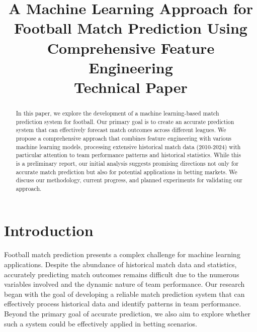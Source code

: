 \documentclass[conference]{IEEEtran}
\begin{document}
\title{A Machine Learning Approach for Football Match Prediction Using Comprehensive Feature Engineering\\
\large{Technical Paper}}

\author{
}

\maketitle

\begin{abstract}
In this paper, we explore the development of a machine learning-based match prediction system for football. Our primary goal is to create an accurate prediction system that can effectively forecast match outcomes across different leagues. We propose a comprehensive approach that combines feature engineering with various machine learning models, processing extensive historical match data (2010-2024) with particular attention to team performance patterns and historical statistics. While this is a preliminary report, our initial analysis suggests promising directions not only for accurate match prediction but also for potential applications in betting markets. We discuss our methodology, current progress, and planned experiments for validating our approach.
\end{abstract}

\section{Introduction}
Football match prediction presents a complex challenge for machine learning applications. Despite the abundance of historical match data and statistics, accurately predicting match outcomes remains difficult due to the numerous variables involved and the dynamic nature of team performance. Our research began with the goal of developing a reliable match prediction system that can effectively process historical data and identify patterns in team performance. Beyond the primary goal of accurate prediction, we also aim to explore whether such a system could be effectively applied in betting scenarios.
\end{document}
